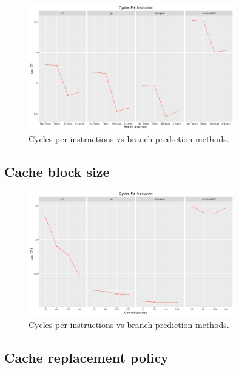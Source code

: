 \documentclass[10pt]{scrartcl}
\begin{document}
\begin{figure}[h]
  \centering
  \includegraphics[width=0.8\textwidth]{Plots/plot_BP_sim_CPI}
  \caption{Cycles per instructions vs branch prediction methods.}\label{fig:bp_sim_cpi}
\end{figure}

\FloatBarrier

\subsection{Cache block size}

\begin{figure}[h]
  \centering
  \includegraphics[width=0.8\textwidth]{Plots/plot_CacheBS_sim_CPI}
  \caption{Cycles per instructions vs branch prediction methods.}\label{fig:cache-bs_sim_cpi}
\end{figure}

\FloatBarrier

\subsection{Cache replacement policy}
\end{document}

